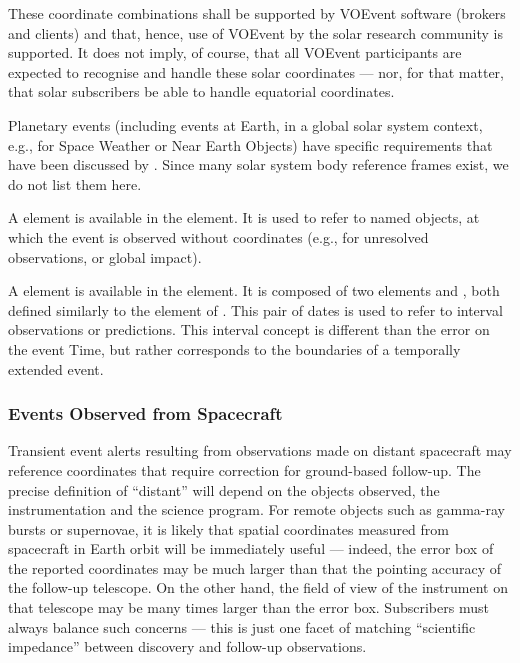\documentclass[11pt,a4paper]{ivoa}
\begin{document}
These coordinate combinations shall be supported by VOEvent software (brokers 
and clients) and that, hence, use of VOEvent by the solar research community is
supported. It does not imply, of course, that all VOEvent participants are
expected to recognise and handle these solar coordinates --- nor, for that
matter, that solar subscribers be able to handle equatorial coordinates.

Planetary events (including events at Earth, in a global solar system context,
e.g., for Space Weather or Near Earth Objects) have specific requirements that
have been discussed by \citet{2018arXiv181112680C}. Since many solar system body
reference frames exist, we do not list them here.

A  element is available in the
 element. It is used to refer to named objects,
at which the event is observed without coordinates (e.g., for unresolved
observations, or global impact).

A  element is available in the
 element. It is composed of two elements
 and , both defined similarly to
the  element of . This pair of dates is used to refer to
interval observations or predictions. This interval concept is different than
the error on the event Time, but rather corresponds to the boundaries of a
temporally extended event.

\subsubsection{Events Observed from Spacecraft}
\label{sec:3.4.5}
Transient event alerts resulting from observations made on distant spacecraft
may reference coordinates that require correction for ground-based follow-up.
The precise definition of ``distant'' will depend on the objects observed, the
instrumentation and the science program. For remote objects such as gamma-ray
bursts or supernovae, it is likely that spatial coordinates measured from
spacecraft in Earth orbit will be immediately useful --- indeed, the error box
of the reported coordinates may be much larger than that the pointing accuracy
of the follow-up telescope. On the other hand, the field of view of the
instrument on that telescope may be many times larger than the error box.
Subscribers must always balance such concerns --- this is just one facet of
matching ``scientific impedance'' between discovery and follow-up observations.
\end{document}
